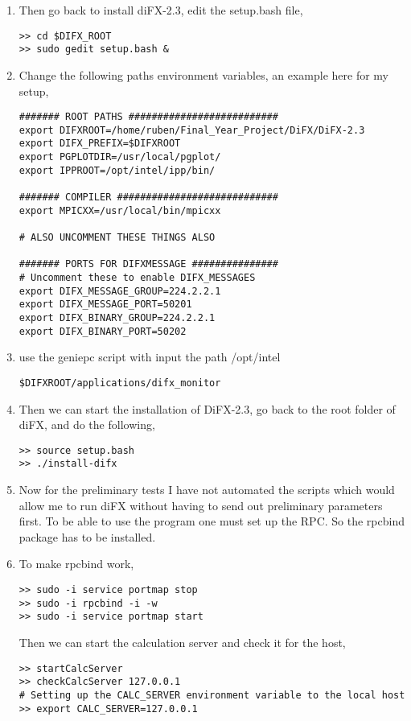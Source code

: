 \begin{enumerate}
\item Then go back to install diFX-2.3, edit the setup.bash file,
\begin{verbatim}
>> cd $DIFX_ROOT
>> sudo gedit setup.bash &
\end{verbatim}
\item Change the following paths environment variables, an  example  here for my setup,
\begin{verbatim}
####### ROOT PATHS ##########################
export DIFXROOT=/home/ruben/Final_Year_Project/DiFX/DiFX-2.3
export DIFX_PREFIX=$DIFXROOT
export PGPLOTDIR=/usr/local/pgplot/
export IPPROOT=/opt/intel/ipp/bin/

####### COMPILER ############################
export MPICXX=/usr/local/bin/mpicxx

# ALSO UNCOMMENT THESE THINGS ALSO

####### PORTS FOR DIFXMESSAGE ###############
# Uncomment these to enable DIFX_MESSAGES
export DIFX_MESSAGE_GROUP=224.2.2.1
export DIFX_MESSAGE_PORT=50201
export DIFX_BINARY_GROUP=224.2.2.1
export DIFX_BINARY_PORT=50202

\end{verbatim}
\item use the geniepc script with input the path /opt/intel
\begin{verbatim}
$DIFXROOT/applications/difx_monitor
\end{verbatim} 



\item Then we can start the installation of DiFX-2.3, go back to the root folder of diFX, and do the following,
\begin{verbatim}
>> source setup.bash
>> ./install-difx
\end{verbatim}

\item Now for the preliminary tests I have not automated the scripts which would allow me to run diFX without having to send out preliminary parameters first. To be able to use the program one must set up the RPC. So the rpcbind package has to be installed.

\item To make rpcbind work,
\begin{verbatim}
>> sudo -i service portmap stop
>> sudo -i rpcbind -i -w
>> sudo -i service portmap start 
\end{verbatim}

Then we can start the calculation server and check it for the host,
\begin{verbatim}
>> startCalcServer
>> checkCalcServer 127.0.0.1
# Setting up the CALC_SERVER environment variable to the local host
>> export CALC_SERVER=127.0.0.1
\end{verbatim}


\end{enumerate}

